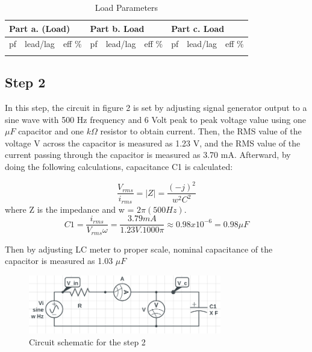 \documentclass[letterpaper,12pt]{article}
\begin{document}
\begin{table}[H]
  \begin{center}
    \caption{Load Parameters}
    \vspace{2mm}
 \begin{tabular}{||lll|lll|lll||}
    \hline
    \multicolumn{3}{|l|}{Part a. (Load)}                            & \multicolumn{3}{l|}{Part b. Load}                            & \multicolumn{3}{l|}{Part c. Load}                            \\ \hline
    \multicolumn{1}{|l|}{pf} & \multicolumn{1}{l|}{lead/lag} & eff \(\%\) & \multicolumn{1}{l|}{pf} & \multicolumn{1}{l|}{lead/lag} &eff \(\%\)  & \multicolumn{1}{l|}{pf} & \multicolumn{1}{l|}{lead/lag} &eff \(\%\)  \\ \hline
    \multicolumn{1}{|l|}{} & \multicolumn{1}{l|}{} &  & \multicolumn{1}{l|}{} & \multicolumn{1}{l|}{} &  & \multicolumn{1}{l|}{} & \multicolumn{1}{l|}{} &  \\ \hline
    \end{tabular}
\end{center}

\end{table}
\subsection{Step 2}

In this step, the circuit in figure 2 is set by adjusting signal generator output to a sine wave with 500 Hz frequency and 6 Volt peak to peak voltage value using one \(\mu F\) capacitor and one \(k\Omega \) resistor to obtain current. Then, the RMS value of the voltage V across the capacitor is measured as 1.23 V, and the RMS value of the current passing through the capacitor is measured as 3.70 mA. Afterward, by doing the following calculations, capacitance C1 is calculated:

\[\frac{V_{rms}}{i_{rms}} = |Z| = \frac{(-j)^2}{w^2C^2}\]
where Z is the impedance and w = \(2\pi (500 Hz)\).  
\[C1 = \frac{i_{rms}}{V_{rms}\omega}  =  \frac{3.79 mA}{1.23 V . 1000\pi} \approx 0.98x10^{-6} = 0.98 \mu F\]

Then by adjusting LC meter to proper scale, nominal capacitance of the capacitor is measured as 1.03 \(\mu F\)
\begin{figure}[H]
    \centering
    \includegraphics[width = 0.75\textwidth]{2SCH.png}
    \caption{Circuit schematic for the step 2}
\end{figure} 
    
\end{document}
